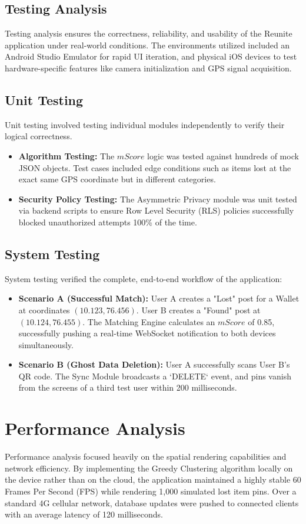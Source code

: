 \documentclass[12pt,a4paper]{report}
\begin{document}
\subsection{Testing Analysis}
Testing analysis ensures the correctness, reliability, and usability of the Reunite application under real-world conditions. The environments utilized included an Android Studio Emulator for rapid UI iteration, and physical iOS devices to test hardware-specific features like camera initialization and GPS signal acquisition.

\subsection{Unit Testing}
Unit testing involved testing individual modules independently to verify their logical correctness. 
\begin{itemize}
    \item \textbf{Algorithm Testing:} The $mScore$ logic was tested against hundreds of mock JSON objects. Test cases included edge conditions such as items lost at the exact same GPS coordinate but in different categories.
    \item \textbf{Security Policy Testing:} The Asymmetric Privacy module was unit tested via backend scripts to ensure Row Level Security (RLS) policies successfully blocked unauthorized attempts 100\% of the time.
\end{itemize}

\subsection{System Testing}
System testing verified the complete, end-to-end workflow of the application:
\begin{itemize}
    \item \textbf{Scenario A (Successful Match):} User A creates a "Lost" post for a Wallet at coordinates $(10.123, 76.456)$. User B creates a "Found" post at $(10.124, 76.455)$. The Matching Engine calculates an $mScore$ of 0.85, successfully pushing a real-time WebSocket notification to both devices simultaneously.
    \item \textbf{Scenario B (Ghost Data Deletion):} User A successfully scans User B's QR code. The Sync Module broadcasts a `DELETE` event, and pins vanish from the screens of a third test user within 200 milliseconds.
\end{itemize}

\section{Performance Analysis}
Performance analysis focused heavily on the spatial rendering capabilities and network efficiency. 
By implementing the Greedy Clustering algorithm locally on the device rather than on the cloud, the application maintained a highly stable 60 Frames Per Second (FPS) while rendering 1,000 simulated lost item pins. Over a standard 4G cellular network, database updates were pushed to connected clients with an average latency of 120 milliseconds.
\end{document}
